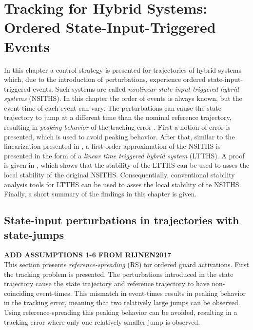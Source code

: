 \documentclass[../DC2017114Bouma.tex]{subfiles}
\begin{document}
\graphicspath{{03_Contribution/img/}}
\renewcommand{\chaptermark}[1]{\markboth{\thechapter.\ #1}{}}
\renewcommand{\sectionmark}[1]{\markright{#1}{}}

\pagestyle{fancyreport}
\cleartooddpage
\pagestyle{fancyreport}
\chapter{Tracking for Hybrid Systems: Ordered State-Input-Triggered Events}\label{ch:order}
In this chapter a control strategy is presented for trajectories of hybrid systems which, due to the introduction of perturbations, experience ordered state-input-triggered events. Such systems are called \textit{nonlinear state-input triggered hybrid systems} (NSITHS). In this chapter the order of events is always known, but the event-time of each event can vary. The perturbations can cause the state trajectory to jump at a different time than the nominal reference trajectory, resulting in \textit{peaking behavior} of the tracking error \cite{Menini2001,Biemond2013}. First a notion of error \cite{Rijnen2017} is presented, which is used to avoid peaking behavior. After that, similar to the linearization presented in \cite{Rijnen2017}, a first-order approximation of the NSITHS is presented in the form of a \textit{linear time triggered hybrid system} (LTTHS). A proof is given in \cite{Rijnen2017}, which shows that the stability of the LTTHS can be used to asses the local stability of the original NSITHS. Consequentially, conventional stability analysis tools for LTTHS can be used to asses the local stability of te NSITHS. Finally, a short summary of the findings in this chapter is given.

\section{State-input perturbations in trajectories with state-jumps}
\textbf{ADD ASSUMPTIONS 1-6 FROM RIJNEN2017}\\
This section presents \textit{reference-spreading} (RS) for ordered guard activations. First the tracking problem is presented. The perturbations introduced in the state trajectory cause the state trajectory and reference trajectory to have non-coinciding event-times. This mismatch in event-times results in peaking behavior in the tracking error, meaning that two relatively large jumps can be observed. Using reference-spreading this peaking behavior can be avoided, resulting in a tracking error where only one relatively smaller jump is observed.
\end{document}
